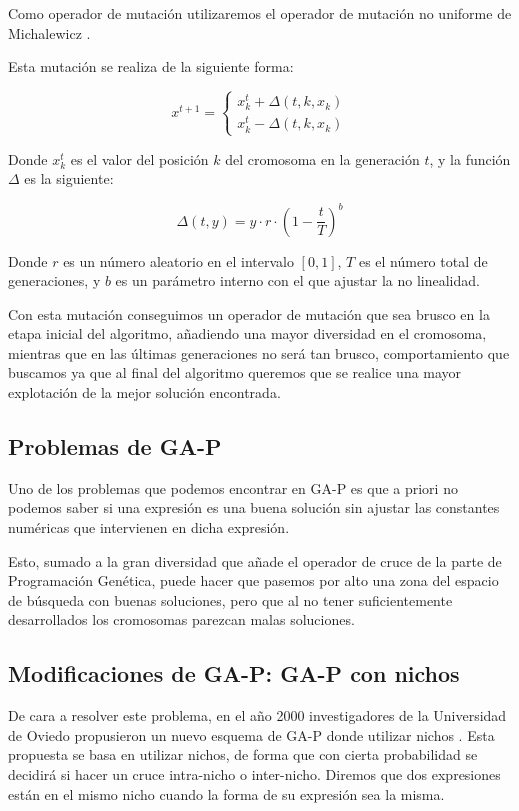 Como operador de mutación utilizaremos el operador de mutación no uniforme de Michalewicz \cite{mutacionMichalewicz}.

Esta mutación se realiza de la siguiente forma:

\[ x^{t + 1} =
	\begin{cases}
		x_k^t + \Delta(t, k, x_k)\\
		x_k^t - \Delta(t, k, x_k)
	\end{cases}
\]

Donde $x_k^t$ es el valor del posición $k$ del cromosoma en la generación $t$, y la función $\Delta$ es la siguiente:

$$ \Delta(t, y) = y \cdot r \cdot (1 - \frac{t}{T})^b $$

Donde $r$ es un número aleatorio en el intervalo $[0, 1]$, $T$ es el número total de generaciones, y $b$ es un parámetro interno con el que ajustar la no linealidad.

Con esta mutación conseguimos un operador de mutación que sea brusco en la etapa inicial del algoritmo, añadiendo una mayor diversidad en el cromosoma, mientras que en las últimas generaciones no será tan brusco, comportamiento que buscamos ya que al final del algoritmo queremos que se realice una mayor explotación de la mejor solución encontrada.

\subsection{Problemas de GA-P}

Uno de los problemas que podemos encontrar en GA-P es que a priori no podemos saber si una expresión es una buena solución sin ajustar las constantes numéricas que intervienen en dicha expresión.

Esto, sumado a la gran diversidad que añade el operador de cruce de la parte de Programación Genética, puede hacer que pasemos por alto una zona del espacio de búsqueda con buenas soluciones, pero que al no tener suficientemente desarrollados los cromosomas parezcan malas soluciones.


\newpage

\subsection{Modificaciones de GA-P: GA-P con nichos}

De cara a resolver este problema, en el año 2000 investigadores de la Universidad de Oviedo propusieron un nuevo esquema de GA-P donde utilizar nichos \cite{GAPnichos}. Esta propuesta se basa en utilizar nichos, de forma que con cierta probabilidad se decidirá si hacer un cruce intra-nicho o inter-nicho. Diremos que dos expresiones están en el mismo nicho cuando la forma de su expresión sea la misma.


